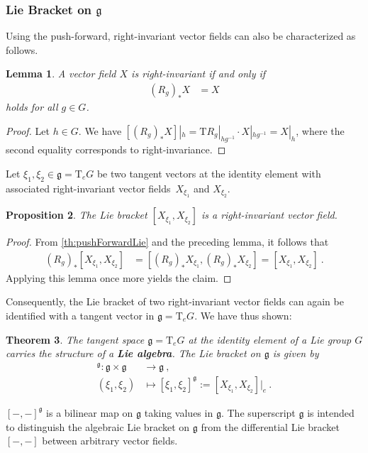 \documentclass[10pt,a4paper]{article}
\theoremstyle{mytheorem}
\newtheorem{theorem}{Theorem}[section]
\newtheorem{proposition}[theorem]{Proposition}
\newtheorem{lemma}[theorem]{Lemma}
\theoremstyle{mydefinition}
\newcommand{\mydef}[1]{\textbf{\textit{#1}}}
\newcommand{\Tt}{\mathrm{T}}
\newcommand{\fg}{\mathfrak{g}}
\begin{document}
\subsubsection{Lie Bracket on $\mathfrak{g}$}

Using the push-forward, right-invariant vector fields can also be characterized as follows.
\begin{lemma}
A vector field $X$ is right-invariant if and only if
\begin{align*}
	(R_g)_*X &= X
\end{align*}
holds for all $g\in G$.
\end{lemma}
\begin{proof}
Let $h\in G$. We have $[(R_g)_*X]|_h=\Tt R_g|_{hg^{-1}}\cdot X|_{hg^{-1}}=X|_h$, where the second equality corresponds to right-invariance.
\end{proof}

Let $\xi_1,\xi_2\in\mathfrak{g}=\Tt_eG$ be two tangent vectors at the identity element with associated right-invariant vector fields~$X_{\xi_1}$ and $X_{\xi_2}$.

\begin{proposition}
The Lie bracket $[X_{\xi_1}, X_{\xi_2}]$ is a right-invariant vector field.
\end{proposition}
\begin{proof}
From \ref{th:pushForwardLie} and the preceding lemma, it follows that
\begin{align*}
	(R_g)_*[X_{\xi_1}, X_{\xi_2}]
	&= [(R_g)_*X_{\xi_1}, (R_g)_*X_{\xi_2}]
	= [X_{\xi_1}, X_{\xi_2}]
	\ .
\end{align*}
Applying this lemma once more yields the claim.
\end{proof}
Consequently, the Lie bracket of two right-invariant vector fields can again be identified with a tangent vector in $\fg=\Tt_eG$.
We have thus shown:
\begin{theorem}
The tangent space $\fg=\Tt_eG$ at the identity element of a Lie group $G$ carries the structure of a \mydef{Lie algebra}.
The Lie bracket on $\fg$ is given by
\begin{align*}
	[-,-]^\mathfrak{g}:
	\mathfrak{g}\times\mathfrak{g}
	&\rightarrow \mathfrak{g}
	\ ,\nonumber\\
	(\xi_1,\xi_2) &\mapsto
	[\xi_1,\xi_2]^\mathfrak{g}
	:= [X_{\xi_1}, X_{\xi_2}]|_e
	\ .
\end{align*}
\end{theorem}
$[-,-]^\fg$ is a bilinear map on $\mathfrak{g}$ taking values in $\mathfrak{g}$.
The superscript $\fg$ is intended to distinguish the algebraic Lie bracket on $\fg$ from the differential Lie bracket $[-,-]$ between arbitrary vector fields.
\end{document}
